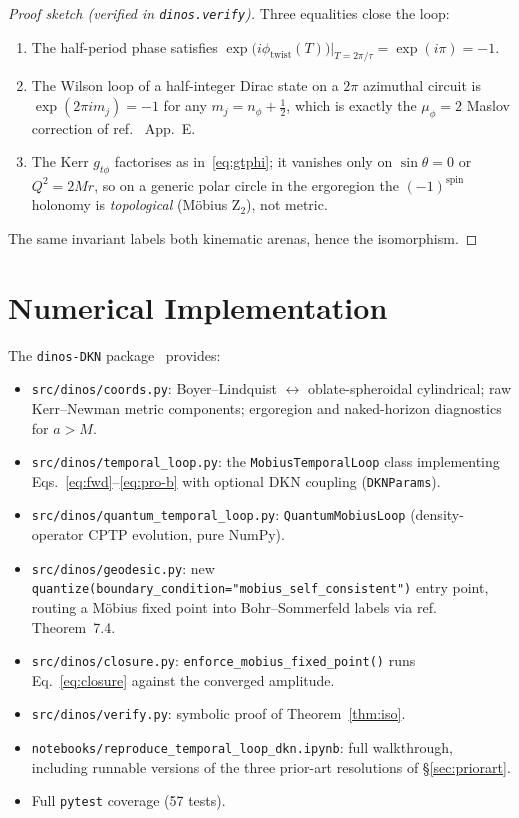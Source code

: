 \documentclass[11pt,a4paper]{article}
\theoremstyle{definition}
\theoremstyle{remark}
\newcommand{\phitwist}{\phi_{\mathrm{twist}}}
\begin{document}
\begin{proof}[Proof sketch (verified in \texttt{dinos.verify})]
Three equalities close the loop:
\begin{enumerate}[leftmargin=1.5em]
  \item The half-period phase satisfies
    $\exp\bigl(i\phitwist(T)\bigr)\big|_{T = 2\pi/\tau} = \exp(i\pi) = -1$.
  \item The Wilson loop of a half-integer Dirac state on a $2\pi$
    azimuthal circuit is
    $\exp(2\pi i m_j) = -1$ for any $m_j = n_\phi + \tfrac12$, which is
    exactly the $\mu_\phi = 2$ Maslov correction of
    ref.~\cite{Knopp2026} App.~E.
  \item The Kerr $g_{t\phi}$ factorises as in~\eqref{eq:gtphi}; it
    vanishes only on $\sin\theta = 0$ or $Q^2 = 2Mr$, so on a generic
    polar circle in the ergoregion the $(-1)^{\text{spin}}$ holonomy is
    \emph{topological} (M\"obius Z$_2$), not metric.
\end{enumerate}
The same invariant labels both kinematic arenas, hence the isomorphism.
\end{proof}

\section{Numerical Implementation}\label{sec:implementation}

The \texttt{dinos-DKN} package~\cite{dinosRepo} provides:
\begin{itemize}[leftmargin=1.2em,itemsep=0.15em]
  \item \texttt{src/dinos/coords.py}: Boyer--Lindquist $\leftrightarrow$
    oblate-spheroidal cylindrical; raw Kerr--Newman metric components;
    ergoregion and naked-horizon diagnostics for $a > M$.
  \item \texttt{src/dinos/temporal\_loop.py}: the
    \texttt{MobiusTemporalLoop} class implementing
    Eqs.~\eqref{eq:fwd}--\eqref{eq:pro-b} with optional DKN coupling
    (\texttt{DKNParams}).
  \item \texttt{src/dinos/quantum\_temporal\_loop.py}:
    \texttt{QuantumMobiusLoop} (density-operator CPTP evolution,
    pure NumPy).
  \item \texttt{src/dinos/geodesic.py}: new
    \texttt{quantize(boundary\_condition="mobius\_self\_consistent")}
    entry point, routing a M\"obius fixed point into Bohr--Sommerfeld
    labels via ref.~\cite{Knopp2026} Theorem~7.4.
  \item \texttt{src/dinos/closure.py}:
    \texttt{enforce\_mobius\_fixed\_point()} runs
    Eq.~\eqref{eq:closure} against the converged amplitude.
  \item \texttt{src/dinos/verify.py}:
    symbolic proof of Theorem~\ref{thm:iso}.
  \item \texttt{notebooks/reproduce\_temporal\_loop\_dkn.ipynb}: full
    walkthrough, including runnable versions of the three prior-art
    resolutions of \S\ref{sec:priorart}.
  \item Full \texttt{pytest} coverage (57 tests).
\end{itemize}
\end{document}
